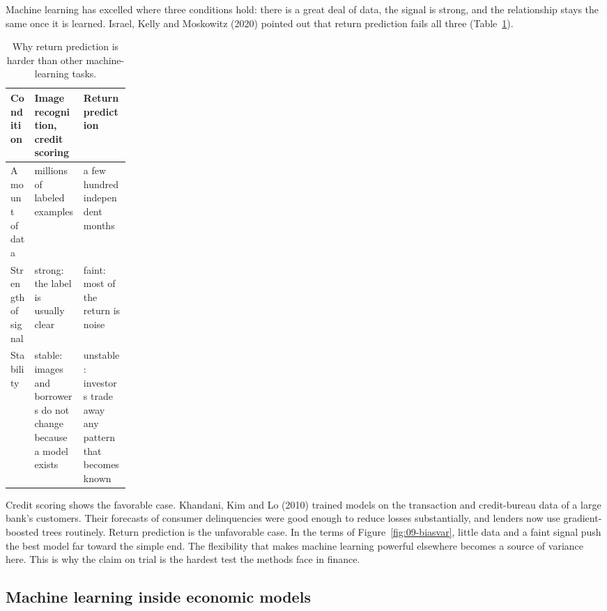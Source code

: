 Machine learning has excelled where three conditions hold: there is a great deal of data, the signal is strong, and the relationship stays the same once it is learned. Israel, Kelly and Moskowitz (2020) pointed out that return prediction fails all three (Table~\ref{tab:20-conditions}).

\begin{table}[htbp]
\centering
\small
\caption{Why return prediction is harder than other machine-learning tasks.}
\label{tab:20-conditions}
\begin{tabularx}{0.9\linewidth}{@{}>{\raggedright\arraybackslash}p{0.2\linewidth}>{\raggedright\arraybackslash}X>{\raggedright\arraybackslash}X@{}}
\toprule
Condition & Image recognition, credit scoring & Return prediction \\
\midrule
Amount of data & millions of labeled examples & a few hundred independent months \\
Strength of signal & strong: the label is usually clear & faint: most of the return is noise \\
Stability & stable: images and borrowers do not change because a model exists & unstable: investors trade away any pattern that becomes known \\
\bottomrule
\end{tabularx}
\end{table}

Credit scoring shows the favorable case. Khandani, Kim and Lo (2010) trained models on the transaction and credit-bureau data of a large bank's customers. Their forecasts of consumer delinquencies were good enough to reduce losses substantially, and lenders now use gradient-boosted trees routinely. Return prediction is the unfavorable case. In the terms of Figure~\ref{fig:09-biasvar}, little data and a faint signal push the best model far toward the simple end. The flexibility that makes machine learning powerful elsewhere becomes a source of variance here. This is why the claim on trial is the hardest test the methods face in finance.

\subsection{Machine learning inside economic models}

